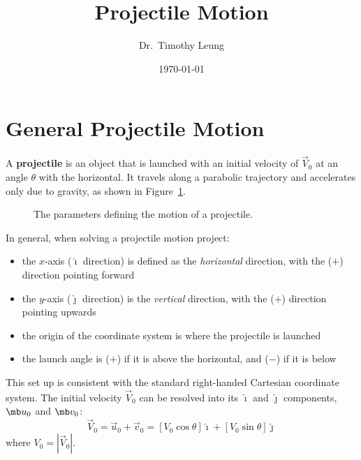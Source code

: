 \documentclass{../../oss-handout}
\title{Projectile Motion}
\author{Dr.\ Timothy Leung}
\date{\today}
\newcommand{\iii}{\hat\imath}
\newcommand{\jjj}{\hat\jmath}
\begin{document}
\thispagestyle{title}
\gentitle

\section{General Projectile Motion}
A \textbf{projectile} is an object that is launched with an initial velocity
of $\vec V_0$ at an angle $\theta$ with the horizontal. It travels along a
parabolic trajectory and accelerates only due to gravity, as shown in
Figure~\ref{fig:projectile}. 
\begin{figure}[ht]
  \centering
  \caption{The parameters defining the motion of a projectile.}
  \label{fig:projectile}
\end{figure}

In general, when solving a projectile motion project:
\begin{itemize}[nosep]
\item the $x$-axis ($\iii$ direction) is defined as the \emph{horizontal}
  direction, with the ($+$) direction pointing forward
\item the $y$-axis ($\jjj$ direction) is the \emph{vertical} direction, with
  the ($+$) direction pointing upwards
\item the origin of the coordinate system is where the projectile is launched
\item the launch angle is ($+$) if it is above the horizontal, and ($-$) if it
  is below
\end{itemize}
This set up is consistent with the standard right-handed Cartesian coordinate
system. The initial velocity $\vec V_0$ can be resolved into its $\iii$ and
$\jjj$ components, $\mb u_0$ and $\mb v_0$:
\begin{equation}
  \vec V_0 =\vec u_0+\vec v_0
  =\left[V_0\cos\theta\right]\iii + \left[V_0\sin\theta\right]\jjj
\end{equation}
where $V_0=|\vec V_0|$.
\end{document}
